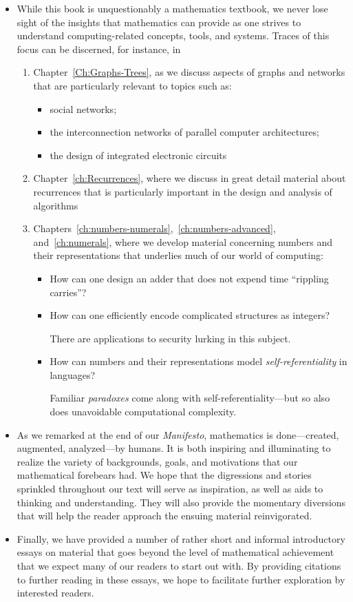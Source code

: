 \begin{itemize}
\item
While this book is unquestionably a mathematics textbook, we never
lose sight of the insights that mathematics can provide as one strives
to understand computing-related concepts, tools, and systems.  Traces
of this focus can be discerned, for instance, in
  \begin{enumerate}
  \item
Chapter~\ref{Ch:Graphs-Trees}, as we discuss aspects of graphs and
networks that are particularly relevant to topics such as:
     \begin{itemize}
     \item
social networks;
     \item
the interconnection networks of parallel computer architectures;
     \item
the design of integrated electronic circuits
     \end{itemize}
  \item
Chapter~\ref{ch:Recurrences}, where we discuss in great detail
material about recurrences that is particularly important in the
design and analysis of algorithms
  \item
Chapters~\ref{ch:numbers-numerals},~\ref{ch:numbers-advanced},
and~\ref{ch:numerals}, where we develop material concerning numbers
and their representations that underlies much of our world of
computing:
     \begin{itemize}
     \item
How can one design an adder that does not expend time ``rippling
carries''?
     \item
How can one efficiently encode complicated structures as integers?

There are applications to security lurking in this subject.
     \item
How can numbers and their representations model {\em
  self-referentiality} in languages?

Familiar {\it paradoxes} come along with self-referentiality---but so
also does unavoidable computational complexity.
     \end{itemize}
  \end{enumerate}
\item
As we remarked at the end of our {\it Manifesto}, mathematics is
done---created, augmented, analyzed---by humans.  It is both inspiring
and illuminating to realize the variety of backgrounds, goals, and
motivations that our mathematical forebears had.  We hope that the
digressions and stories sprinkled throughout our text will serve as
inspiration, as well as aids to thinking and understanding.  They will
also provide the momentary diversions that will help the reader
approach the ensuing material reinvigorated.

\item
Finally, we have provided a number of rather short and informal
introductory essays on material that goes beyond the level of
mathematical achievement that we expect many of our readers to start
out with.  By providing citations to further reading in these essays,
we hope to facilitate further exploration by interested readers.
\end{itemize}




